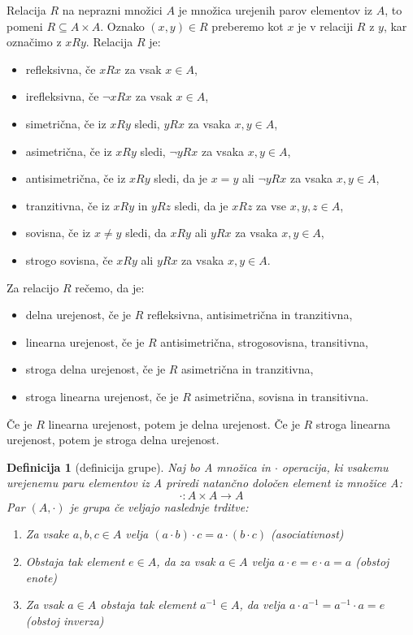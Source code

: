 \documentclass[a4paper, 12pt]{book}
\newtheorem{definicija}{Definicija}[chapter]
\begin{document}
Relacija $R$ na neprazni množici $A$ je množica urejenih parov elementov iz $A$, to pomeni $R\subseteq A\times A$. Oznako $(x, y) \in R$ preberemo kot $x$ je v relaciji $R$ z $y$, kar označimo z $xRy$. Relacija $R$ je:
\begin{itemize}
    \item refleksivna, če $xRx$ za vsak $x\in A$,
    \item irefleksivna, če $\neg xRx$ za vsak $x\in A$,
    \item simetrična, če iz $xRy$ sledi, $yRx$ za vsaka $x,y\in A$,
    \item asimetrična, če iz $xRy$ sledi, $\neg yRx$ za vsaka $x,y\in A$,
    \item antisimetrična, če iz $xRy$ sledi, da je $x = y$ ali $\neg yRx$ za vsaka $x,y\in A$,
    \item tranzitivna, če iz $xRy$ in $yRz$ sledi, da je $xRz$ za vse $x,y,z\in A$,
    \item sovisna, če iz $x \neq y$ sledi, da $xRy$ ali $yRx$ za vsaka $x,y\in A$,
    \item strogo sovisna, če $xRy$ ali $yRx$ za vsaka $x,y\in A$.
\end{itemize}
Za relacijo $R$ rečemo, da je:
\begin{itemize}
    \item delna urejenost, če je $R$ refleksivna, antisimetrična in tranzitivna,
    \item linearna urejenost, če je $R$ antisimetrična, strogosovisna, transitivna,
    \item stroga delna urejenost, če je $R$ asimetrična in tranzitivna,
    \item stroga linearna urejenost, če je $R$ asimetrična, sovisna in transitivna.
\end{itemize}
Če je $R$ linearna urejenost, potem je delna urejenost. Če je $R$ stroga linearna urejenost, potem je stroga delna urejenost.


\begin{definicija}[definicija grupe]
    Naj bo A množica in $\cdot$ operacija, ki vsakemu urejenemu paru elementov iz A priredi natančno določen element iz množice A:
    \[
        \cdot:A \times A \rightarrow A 
    \]
    Par $(A, \cdot)$ je grupa če veljajo naslednje trditve:
    \begin{enumerate}
        \item Za vsake $a, b, c \in A$ velja $(a \cdot b) \cdot c = a \cdot (b \cdot c)$ (asociativnost)
        \item Obstaja tak element $e \in A$, da za vsak $a \in A$ velja $a \cdot e = e \cdot a = a$ (obstoj enote)
        \item Za vsak $a \in A$ obstaja tak element $a^{-1} \in A$, da velja $a \cdot a^{-1} = a^{-1} \cdot a = e$ (obstoj inverza)
        
    \end{enumerate}
\end{definicija}
\end{document}
